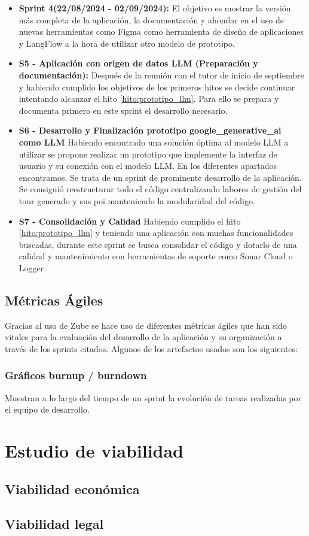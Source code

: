 \begin{itemize}
    \item \textbf{Sprint 4(22/08/2024 - 02/09/2024):} El objetivo es mostrar la versión más completa de la aplicación, la documentación y ahondar en el uso de nuevas herramientas como Figma como herramienta de diseño de aplicaciones y LangFlow a la hora de utilizar otro modelo de prototipo.
    
\item \textbf{S5 - Aplicación con origen de datos LLM (Preparación y documentación):} Después de la reunión con el tutor de inicio de septiembre y habiendo cumplido los objetivos de los primeros hitos se decide continuar intentando alcanzar el hito \ref{hito:prototipo_llm}. Para ello se prepara y documenta primero en este sprint el desarrollo necesario.

\item \textbf{S6 - Desarrollo y Finalización prototipo google\_generative\_ai como LLM} Habiendo encontrado una solución óptima al modelo LLM a utilizar se propone realizar un prototipo que implemente la interfaz de usuario y su conexión con el modelo LLM. En los diferentes apartados encontramos. Se trata de un sprint de prominente desarrollo de la aplicación. Se consiguió reestructurar todo el código centralizando labores de gestión del tour generado y sus \acrshort{poi} manteniendo la modularidad del código.
	
	\item \textbf{S7 - Consolidación y Calidad} Habiendo cumplido el hito \ref{hito:prototipo_llm} y teniendo una aplicación con muchas funcionalidades buscadas, durante este sprint se busca consolidar el código y dotarlo de una calidad y mantenimiento con herramientas de soporte como Sonar Cloud o Logger.
    
\end{itemize}

\subsection{Métricas Ágiles}
Gracias al uso de Zube se hace uso de diferentes métricas ágiles que han sido vitales para la evaluación del desarrollo de la aplicación y su organización a través de los sprints citados. Algunos de los artefactos usados son los siguientes:
\subsubsection{Gráficos burnup / burndown} 
Muestran a lo largo del tiempo de un sprint la evolución de tareas realizadas por el equipo de desarrollo.

\section{Estudio de viabilidad}

\subsection{Viabilidad económica}

\subsection{Viabilidad legal}


